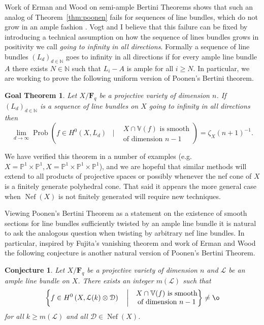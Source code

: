 \documentclass[10pt,reqno]{amsart}
\newtheorem{goalTheorem}[lemma]{Goal Theorem}
\newtheorem{conj}[lemma]{Conjecture}
\theoremstyle{remark}
\newcommand{\Prob}{\operatorname{Prob}}
\newcommand{\Nef}{\operatorname{Nef}}
\newcommand{\fF}{\mathbf F}
\newcommand{\cD}{\mathcal{D}}
\newcommand{\cL}{\mathcal{L}}
\newcommand{\N}{\mathbb{N}}
\renewcommand{\P}{\mathbb{P}}
\newcommand{\V}{\mathbb{V}}
\begin{document}
Work of Erman and Wood on semi-ample Bertini Theorems shows that such an analog of Theorem~\ref{thm:poonen} fails for sequences of line bundles, which do not grow in an ample fashion \cite{ermanWood15}. Vogt and I believe that this failure can be fixed by introducing a technical assumption on how the sequence of lines bundles grows in positivity we call \textit{going to infinity in all directions}. Formally a sequence of line bundles  $\left(L_{d}\right)_{d\in\N}$ goes to infinity in all directions if for every ample line bundle $A$ there exists $N\in \N$ such that $L_{i}-A$ is ample for all $i\geq N$. In particular, we are working to prove the following uniform version of Poonen's Bertini theorem.
 
\begin{goalTheorem}\label{gthm:effective-bertini}
Let $X/\fF_{q}$ be a projective variety of dimension $n$. If $\left(L_{d}\right)_{d\in\N}$ is a sequence of line bundles on $X$ going to infinity in all directions then 
\begin{equation}
\lim_{d\to \infty} \Prob\left(f \in H^0\left(X, L_{d}\right)  \;\;\; \bigg| \;\;\; 
\begin{matrix}
 \text{$X\cap\V(f)$ is smooth}\\
 \text{of dimension $n-1$}
 \end{matrix}
\right)=
\zeta_X(n+1)^{-1}.
\end{equation}
\end{goalTheorem}

We have verified this theorem in a number of examples (e.g. $X=\P^1\times\P^1, X=\P^1\times\P^1\times\P^1$), and we are hopeful that similar methods will extend to all products of projective spaces or possibly whenever the nef cone of $X$ is a finitely generate polyhedral cone. That said it appears the more general case when $\Nef(X)$ is not finitely generated will require new techniques. 

Viewing Poonen's Bertini Theorem as a statement on the existence of smooth sections for line bundles sufficiently twisted by an ample line bundle it is natural to ask the analogous question when twisting by arbitrary nef line bundles. In particular, inspired by Fujita's vanishing theorem and work of Erman and Wood the following conjecture is another natural version of Poonen's Bertini Theorem. 

 \begin{conj}
 Let $X/\fF_{q}$ be a projective variety of dimension $n$ and $\cL$ be an ample line bundle on $X$. There exists an integer $m(\cL)$ such that 
\begin{equation}
\left\{
f \in H^0\left(X, \cL(k)\otimes \cD\right) \quad \bigg| \quad 
\begin{matrix}
 \text{$X\cap\V(f)$ is smooth}\\
 \text{of dimension $n-1$}
 \end{matrix}
\right\}\neq\o
\end{equation}
for all $k\geq m(\cL)$ and all $\cD\in \Nef(X)$. 
 \end{conj}
\end{document}

